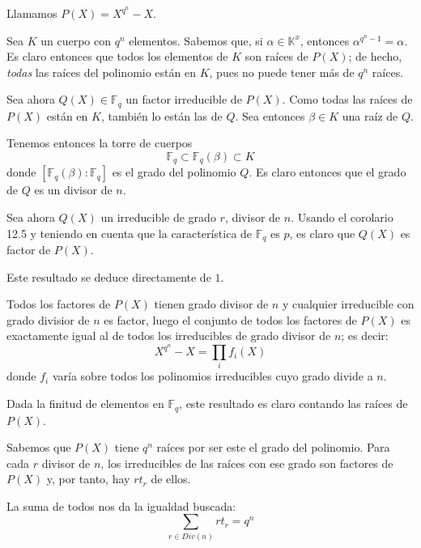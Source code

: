 \documentclass[a4paper, 11pt]{article}
\begin{document}
  \begin{solucion}
      \begin{apartado}
          Llamamos $P(X)=X^{q^n}-X$.

          Sea $K$ un cuerpo con $q^n$ elementos. Sabemos que, si $\alpha\in\mathbb{K}^x$, entonces $\alpha^{q^n-1} = \alpha$. Es claro entonces que todos los elementos de $K$ son raíces de $P(X)$; de hecho, \emph{todas} las raíces del polinomio están en $K$, pues no puede tener más de $q^n$ raíces.

          Sea ahora $Q(X)\in\mathbb{F}_q$ un factor irreducible de $P(X)$. Como todas las raíces de $P(X)$ están en $K$, también lo están las de $Q$. Sea entonces $\beta\in K$ una raíz de $Q$.

          Tenemos entonces la torre de cuerpos
          \[
          \mathbb{F}_q \subset \mathbb{F}_q(\beta) \subset K
          \]
          donde $[\mathbb{F}_q(\beta):\mathbb{F}_q]$ es el grado del polinomio $Q$. Es claro entonces que el grado de $Q$ es un divisor de $n$.

          Sea ahora $Q(X)$ un irreducible de grado $r$, divisor de $n$. Usando el corolario 12.5 y teniendo en cuenta que la característica de $\mathbb{F}_q$ es $p$, es claro que $Q(X)$ es factor de $P(X)$.
      \end{apartado}

      \begin{apartado}
          Este resultado se deduce directamente de $1$.

          Todos los factores de $P(X)$ tienen grado divisor de $n$ y cualquier irreducible con grado divisior de $n$ es factor, luego el conjunto de todos los factores de $P(X)$ es exactamente igual al de todos los irreducibles de grado divisor de $n$; es decir:
          \[
          X^{q^n}-X = \prod_i f_i(X)
          \]
          donde $f_i$ varía sobre todos los polinomios irreducibles cuyo grado divide a $n$.
      \end{apartado}

      \begin{apartado}
          Dada la finitud de elementos en $\mathbb{F}_q$, este resultado es claro contando las raíces de $P(X)$.

          Sabemos que $P(X)$ tiene $q^n$ raíces por ser este el grado del polinomio. Para cada $r$ divisor de $n$, los irreducibles de las raíces con ese grado son factores de $P(X)$ y, por tanto, hay $rt_r$ de ellos.

          La suma de todos nos da la igualdad buscada:
          \[
          \sum_{r\in Div(n)} r t_r = q^n
          \]


\end{apartado}
\end{solucion}
\end{document}
